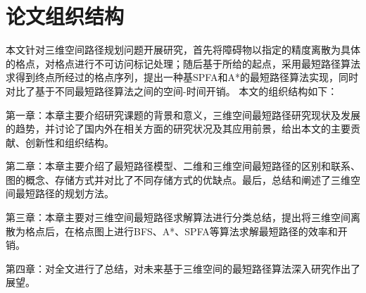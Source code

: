 \section{论文组织结构}
\par 本文针对三维空间路径规划问题开展研究，首先将障碍物以指定的精度离散为具体的格点，对格点进行不可访问标记处理；随后基于所给的起点，采用最短路径算法求得到终点所经过的格点序列，提出一种基SPFA和A*的最短路径算法实现，同时对比了基于不同最短路径算法之间的空间-时间开销。
本文的组织结构如下：
\par 第一章：本章主要介绍研究课题的背景和意义，三维空间最短路径研究现状及发展的趋势，并讨论了国内外在相关方面的研究状况及其应用前景，给出本文的主要贡献、创新性和组织结构。
\par 第二章：本章主要介绍了最短路径模型、二维和三维空间最短路径的区别和联系、图的概念、存储方式并对比了不同存储方式的优缺点。最后，总结和阐述了三维空间最短路径的规划方法。
\par 第三章：本章主要对三维空间最短路径求解算法进行分类总结，提出将三维空间离散为格点后，在格点图上进行BFS、A*、SPFA等算法求解最短路径的效率和开销。
\par 第四章：对全文进行了总结，对未来基于三维空间的最短路径算法深入研究作出了展望。